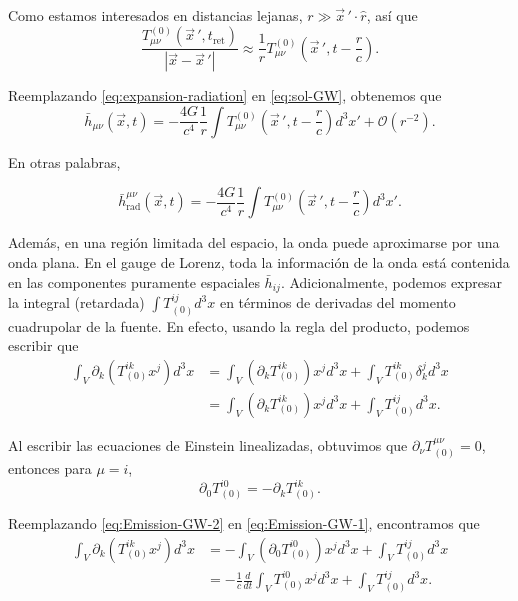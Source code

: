 \documentclass[letterpaper,11pt]{article}
\begin{document}
Como estamos interesados en distancias lejanas, $r \gg \vec{x}\,'\cdot \hat{r}$, así que 
\begin{equation}
\frac{T_{\mu\nu}^{(0)}(\vec{x}\,', t_{\text{ret}})}{|\vec{x} - \vec{x}\,'|} \approx \frac{1}{r}  T_{\mu\nu}^{(0)}\left(\vec{x}\,', t - \frac{r}{c}\right) . \label{eq:expansion-radiation}
\end{equation}

Reemplazando \eqref{eq:expansion-radiation} en \eqref{eq:sol-GW}, obtenemos que
\begin{equation}
\bar{h}_{\mu\nu}(\vec{x},t) = -  \frac{4G}{c^4} \frac{1}{r} \int T_{\mu\nu}^{(0)}\left(\vec{x}\,', t - \frac{r}{c} \right) d^3x' + \mathcal{O}(r^{-2}). 
\end{equation}

En otras palabras,
\begin{shaded}
\begin{equation}
\bar{h}^{\mu\nu}_{\text{rad}} (\vec{x},t) =  -  \frac{4G}{c^4} \frac{1}{r} \int T_{\mu\nu}^{(0)}\left(\vec{x}\,', t - \frac{r}{c} \right) d^3x'. \label{eq:metric-pert-rad}
\end{equation}
\end{shaded}

Además, en una región limitada del espacio, la onda puede aproximarse por una onda plana. En el gauge de Lorenz, toda la información de la onda está contenida en las componentes puramente espaciales $\bar{h}_{ij}$. 
Adicionalmente, podemos expresar la integral (retardada) $\int T_{(0)}^{ij} d^3x$ en términos de derivadas del momento cuadrupolar de la fuente. En efecto, usando la regla del producto, podemos escribir que
\begin{align}
\int_{V} \partial_{k}\left(T^{ik}_{(0)} x^{j} \right) d^3x &= \int_{V} \left(\partial_{k} T^{ik}_{(0)} \right) x^{j} d^3x + \int_{V} T^{ik}_{(0)} \delta^{j}_{k} d^3x \nonumber \\
&= \int_{V} \left(\partial_{k} T^{ik}_{(0)} \right) x^{j} d^3x + \int_{V} T^{ij}_{(0)}  d^3x. \label{eq:Emission-GW-1}
\end{align}

Al escribir las ecuaciones de Einstein linealizadas, obtuvimos que $\partial_{\nu} T_{(0)}^{\mu\nu} = 0$, entonces para $\mu = i$,
\begin{equation}
\partial_0 T_{(0)}^{i0} = - \partial_k T_{(0)}^{ik}. \label{eq:Emission-GW-2}
\end{equation}

Reemplazando \eqref{eq:Emission-GW-2} en \eqref{eq:Emission-GW-1}, encontramos que
\begin{align}
\int_{V} \partial_{k}\left(T^{ik}_{(0)} x^{j} \right) d^3x &= - \int_{V} \left(\partial_{0} T_{(0)}^{i0} \right) x^{j} d^3 x  + \int_{V} T_{(0)}^{ij} d^3x \nonumber \\
&= - \frac{1}{c} \frac{d}{dt} \int_{V} T_{(0)}^{i0} x^{j} d^3x + \int_{V} T_{(0)}^{ij} d^3x. \label{eq:Emission-GW-3}
\end{align}
\end{document}
